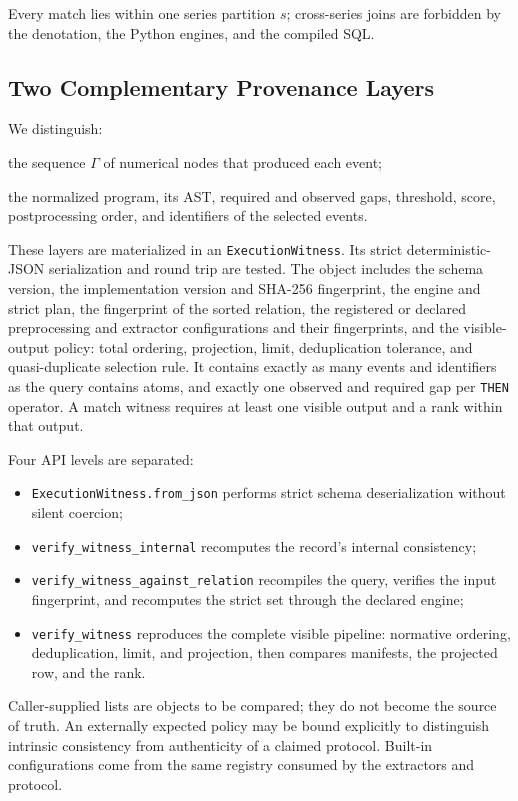 \documentclass[11pt,a4paper]{article}
\newcommand{\code}[1]{\texttt{#1}}
\begin{document}
Every match lies within one series partition $s$; cross-series joins are forbidden by the denotation, the Python engines, and the compiled SQL.

\subsection{Two Complementary Provenance Layers}

We distinguish:
\begin{description}[style=nextline,leftmargin=1.2cm]
  \item[Extraction provenance] the sequence $\Gamma$ of numerical nodes that produced each event;
  \item[Query provenance] the normalized program, its AST, required and observed gaps, threshold, score, postprocessing order, and identifiers of the selected events.
\end{description}
These layers are materialized in an \code{ExecutionWitness}. Its strict deterministic-JSON serialization and round trip are tested. The object includes the schema version, the implementation version and SHA-256 fingerprint, the engine and strict plan, the fingerprint of the sorted relation, the registered or declared preprocessing and extractor configurations and their fingerprints, and the visible-output policy: total ordering, projection, limit, deduplication tolerance, and quasi-duplicate selection rule. It contains exactly as many events and identifiers as the query contains atoms, and exactly one observed and required gap per \code{THEN} operator. A match witness requires at least one visible output and a rank within that output.

Four API levels are separated:
\begin{itemize}
  \item \code{ExecutionWitness.from\_json} performs strict schema deserialization without silent coercion;
  \item \code{verify\_witness\_internal} recomputes the record's internal consistency;
  \item \code{verify\_witness\_against\_relation} recompiles the query, verifies the input fingerprint, and recomputes the strict set through the declared engine;
  \item \code{verify\_witness} reproduces the complete visible pipeline: normative ordering, deduplication, limit, and projection, then compares manifests, the projected row, and the rank.
\end{itemize}
Caller-supplied lists are objects to be compared; they do not become the source of truth. An externally expected policy may be bound explicitly to distinguish intrinsic consistency from authenticity of a claimed protocol. Built-in configurations come from the same  registry consumed by the extractors and protocol.
\end{document}
